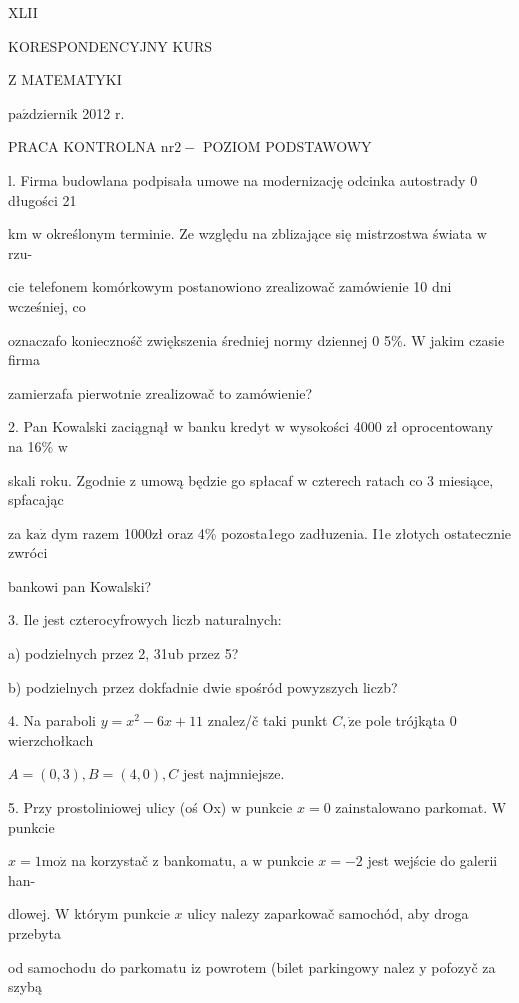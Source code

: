 \documentclass[a4paper,12pt]{article}
\begin{document}
XLII

KORESPONDENCYJNY KURS

Z MATEMATYKI

$\mathrm{p}\mathrm{a}\acute{\mathrm{z}}$dziernik 2012 $\mathrm{r}.$

PRACA KONTROLNA $\mathrm{n}\mathrm{r} 2-$ POZIOM PODSTAWOWY

l. Firma budowlana podpisała umowe na modernizację odcinka autostrady $0$ długości 21

km $\mathrm{w}$ określonym terminie. Ze względu na zblizające się mistrzostwa świata $\mathrm{w}$ rzu-

cie telefonem komórkowym postanowiono zrealizowač zamówienie 10 dni wcześniej, co

oznaczafo koniecznośč zwiększenia średniej normy dziennej $0$ 5\%. $\mathrm{W}$ jakim czasie firma

zamierzafa pierwotnie zrealizowač to zamówienie?

2. Pan Kowalski zaciągnął $\mathrm{w}$ banku kredyt $\mathrm{w}$ wysokości 4000 zł oprocentowany na 16\% $\mathrm{w}$

skali roku. Zgodnie $\mathrm{z}$ umową będzie go spłacaf $\mathrm{w}$ czterech ratach co 3 miesiące, spfacając

za $\mathrm{k}\mathrm{a}\dot{\mathrm{z}}$ dym razem 1000zł oraz 4\% pozosta1ego zadłuzenia. I1e złotych ostatecznie zwróci

bankowi pan Kowalski?

3. Ile jest czterocyfrowych liczb naturalnych:

a) podzielnych przez 2, 31ub przez 5?

b) podzielnych przez dokfadnie dwie spośród powyzszych liczb?

4. Na paraboli $y=x^{2}-6x+11$ znalez/č taki punkt $C, \dot{\mathrm{z}}\mathrm{e}$ pole trójkąta $0$ wierzchołkach

$A=(0,3), B=(4,0), C$ jest najmniejsze.

5. Przy prostoliniowej ulicy (oś Ox) $\mathrm{w}$ punkcie $x=0$ zainstalowano parkomat. $\mathrm{W}$ punkcie

$x=1 \mathrm{m}\mathrm{o}\dot{\mathrm{z}}$ na korzystač $\mathrm{z}$ bankomatu, a $\mathrm{w}$ punkcie $x=-2$ jest wejście do galerii han-

dlowej. $\mathrm{W}$ którym punkcie $x$ ulicy nalezy zaparkowač samochód, aby droga przebyta

od samochodu do parkomatu $\mathrm{i}\mathrm{z}$ powrotem (bilet parkingowy nalez $\mathrm{y}$ pofozyč za szybą
\end{document}
